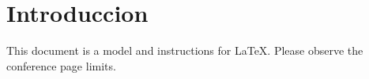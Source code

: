 
\section{Introduccion}
This document is a model and instructions for \LaTeX.
Please observe the conference page limits. 